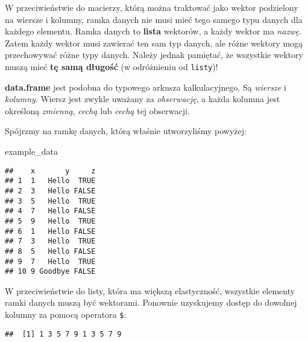 \documentclass[
]{article}
\newenvironment{Shaded}{\begin{snugshade}}{\end{snugshade}}
\newcommand{\FunctionTok}[1]{\textcolor[rgb]{0.00,0.00,0.00}{#1}}
\newcommand{\NormalTok}[1]{#1}
\newcommand{\SpecialCharTok}[1]{\textcolor[rgb]{0.00,0.00,0.00}{#1}}
\begin{document}
W przeciwieństwie do macierzy, którą można traktować jako wektor
podzielony na wiersze i kolumny, ramka danych nie musi mieć tego samego
typu danych dla każdego elementu. Ramka danych to \textbf{lista}
wektorów, a każdy wektor ma \emph{nazwę}. Zatem każdy wektor musi
zawierać ten sam typ danych, ale różne wektory mogą przechowywać różne
typy danych. Należy jednak pamiętać, że wszystkie wektory muszą mieć
\textbf{tę samą długość} (w odróżnieniu od \texttt{listy})!

\begin{tip}
\textbf{data.frame} jest podobna do typowego arkusza kalkulacyjnego. Są
\emph{wiersze} i \emph{kolumny}. Wiersz jest zwykle uważany za
\emph{obserwację}, a każda kolumna jest określoną \emph{zmienną},
\emph{cechą} lub \emph{cechą} tej obserwacji.
\end{tip}

Spójrzmy na ramkę danych, którą właśnie utworzyliśmy powyżej:

\begin{Shaded}
\begin{Highlighting}[]
\NormalTok{example\_data}
\end{Highlighting}
\end{Shaded}

\begin{verbatim}
##    x       y     z
## 1  1   Hello  TRUE
## 2  3   Hello FALSE
## 3  5   Hello  TRUE
## 4  7   Hello FALSE
## 5  9   Hello  TRUE
## 6  1   Hello FALSE
## 7  3   Hello  TRUE
## 8  5   Hello FALSE
## 9  7   Hello  TRUE
## 10 9 Goodbye FALSE
\end{verbatim}

W przeciwieństwie do listy, która ma większą elastyczność, wszystkie
elementy ramki danych muszą być wektorami. Ponownie uzyskujemy dostęp do
dowolnej kolumny za pomocą operatora \texttt{\$}:

\begin{Shaded}
\end{Shaded}

\begin{verbatim}
##  [1] 1 3 5 7 9 1 3 5 7 9
\end{verbatim}

\begin{Shaded}
\end{Shaded}
\end{document}
